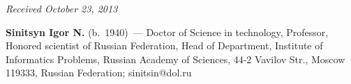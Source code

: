 \vspace*{-9pt}

\hfill{\small\textit{Received October 23, 2013}}

\vspace*{-24pt}

\Contrl

\noindent
\textbf{Sinitsyn Igor N.} (b.\ 1940)~--- Doctor of Science in technology, Professor, 
Honored scientist of Russian Federation, Head of Department,
Institute of Informatics 
Problems, Russian Academy of Sciences,
44-2 Vavilov Str., Moscow 119333, Russian Federation; sinitsin@dol.ru


 \label{end\stat}
 
\renewcommand{\bibname}{\protect\rm Литература}




 
